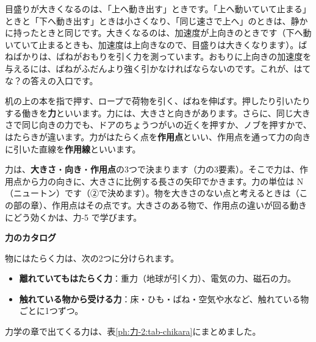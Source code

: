 目盛りが大きくなるのは、「上へ動き出す」ときです。「上へ動いていて止まる」ときと「下へ動き出す」ときは小さくなり、「同じ速さで上へ」のときは、静かに持ったときと同じです。大きくなるのは、加速度が上向きのときです（下へ動いていて止まるときも、加速度は上向きなので、目盛りは大きくなります）。ばねばかりは、ばねがおもりを引く力を測っています。おもりに上向きの加速度を与えるには、ばねがふだんより強く引かなければならないのです。これが、はてな？の答えの入口です。

\begin{omoidasou}
\end{omoidasou}



\leavevmode\label{ph:力-2:sec1}机の上の本を指で押す、ロープで荷物を引く、ばねを伸ばす。押したり引いたりする働きを\textbf{力}といいます。力には、大きさと向きがあります。さらに、同じ大きさで同じ向きの力でも、ドアのちょうつがいの近くを押すか、ノブを押すかで、はたらきが違います。力がはたらく点を\textbf{作用点}といい、作用点を通って力の向きに引いた直線を\textbf{作用線}といいます。

力は、\textbf{大きさ}・\textbf{向き}・\textbf{作用点}の3つで決まります（力の3要素）。そこで力は、作用点から力の向きに、大きさに比例する長さの矢印でかきます。力の単位は N（ニュートン）です（②で決めます）。物を大きさのない点と考えるときは（この部の章）、作用点はその点です。大きさのある物で、作用点の違いが回る動きにどう効くかは、力-5 で学びます。

\noindent\textbf{力のカタログ}\par
\noindent 物にはたらく力は、次の2つに分けられます。
\begin{itemize}[leftmargin=1.2\zw, itemsep=2pt, topsep=2pt, label={\color{bkTheme}●}]
\item \textbf{離れていてもはたらく力}：重力（地球が引く力）、電気の力、磁石の力。
\item \textbf{触れている物から受ける力}：床・ひも・ばね・空気や水など、触れている物ごとに1つずつ。
\end{itemize}
力学の章で出てくる力は、表\ref{ph:力-2:tab-chikara}にまとめました。

